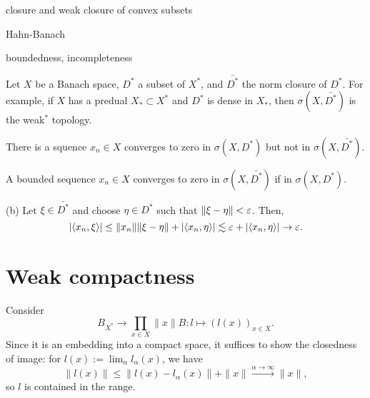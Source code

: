\documentclass{../../large}
\begin{document}
\begin{prb}
closure and weak closure of convex subsets
\end{prb}
\begin{pf}
Hahn-Banach
\end{pf}

\begin{prb}[Polar]
\end{prb}


boundedness, incompleteness

\begin{prb}
Let $X$ be a Banach space, $D^*$ a subset of $X^*$, and $\bar{D^*}$ the norm closure of $D^*$.
For example, if $X$ has a predual $X_*\subset X^*$ and $D^*$ is dense in $X_*$, then $\sigma(X,\bar{D^*})$ is the weak$^*$ topology.
\begin{parts}
\item There is a squence $x_n\in X$ converges to zero in $\sigma(X,D^*)$ but not in $\sigma(X,\bar{D^*})$.
\item A bounded sequence $x_n\in X$ converges to zero in $\sigma(X,\bar{D^*})$ if in $\sigma(X,D^*)$.
\end{parts}
\end{prb}
\begin{pf}
(b)
Let $\xi\in\bar{D^*}$ and choose $\eta\in D^*$ such that $\|\xi-\eta\|<\varepsilon$.
Then,
\[|\langle x_n,\xi\rangle|\le\|x_n\|\|\xi-\eta\|+|\langle x_n,\eta\rangle|\lesssim\varepsilon+|\langle x_n,\eta\rangle|\to\varepsilon.\]
\end{pf}



\section{Weak compactness}
\begin{prb}
\end{prb}
\begin{pf}
Consider
\[B_{X^*}\to\prod_{x\in X}\|x\|B:l\mapsto(l(x))_{x\in X}.\]
Since it is an embedding into a compact space, it suffices to show the closedness of image: for $l(x):=\lim_\alpha l_\alpha(x)$, we have
\[\|l(x)\|\le\|l(x)-l_\alpha(x)\|+\|x\|\xrightarrow{\alpha\to\infty}\|x\|,\]
so $l$ is contained in the range.
\end{pf}
\begin{prb}
\end{prb}
\begin{prb}
\end{prb}
\end{document}
